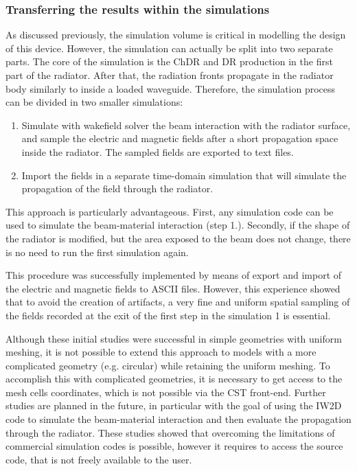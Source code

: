 \subsubsection{Transferring the results within the simulations}

As discussed previously, the simulation volume is critical in modelling the design of this device. However, the simulation can actually be split into two separate parts. The core of the simulation is the ChDR and DR production in the first part of the radiator. After that, the radiation fronts propagate in the radiator body similarly to inside a loaded waveguide. Therefore, the simulation process can be divided in two smaller simulations: 
\begin{enumerate}
\item Simulate with wakefield solver the beam interaction with the radiator surface, and sample the electric and magnetic fields after a short propagation space inside the radiator. The sampled fields are exported to text files.
\item Import the fields in a separate time-domain simulation that will simulate the propagation of the field through the radiator. 
\end{enumerate}
This approach is particularly advantageous. First, any simulation code can be used to simulate the beam-material interaction (step 1.). Secondly, if the shape of the radiator is modified, but the area exposed to the beam does not change, there is no need to run the first simulation again. 

This procedure was successfully implemented by means of export and import of the electric and magnetic fields to ASCII files. However, this experience showed that to avoid the creation of artifacts, a very fine and uniform spatial sampling of the fields recorded at the exit of the first step in the simulation 1 is essential.

Although these initial studies were successful in simple geometries with uniform meshing, it is not possible to extend this approach to models with a more complicated geometry (e.g. circular) while retaining the uniform meshing. To accomplish this with complicated geometries, it is necessary to get access to the mesh cells coordinates, which is not possible via the CST front-end. Further studies are planned in the future, in particular with the goal of using the IW2D~\cite{IW2D} code to simulate the beam-material interaction and then evaluate the propagation through the radiator. These studies showed that overcoming the limitations of commercial simulation codes is possible, however it requires to access the source code, that is not freely available to the user.









